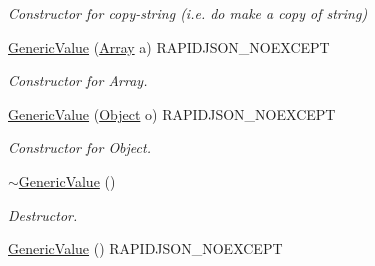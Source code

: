 \begin{DoxyCompactItemize}
\begin{DoxyCompactList}\small\item\em Constructor for copy-\/string (i.\+e. do make a copy of string) \end{DoxyCompactList}\item 
\hyperlink{class_generic_value_a953052ef91e54aabe9bdb9f9eaebf6cc}{Generic\+Value} (\hyperlink{class_generic_array}{Array} a) R\+A\+P\+I\+D\+J\+S\+O\+N\+\_\+\+N\+O\+E\+X\+C\+E\+PT
\begin{DoxyCompactList}\small\item\em Constructor for Array. \end{DoxyCompactList}\item 
\hyperlink{class_generic_value_a9c294e56f4ab940f845f7c171b183483}{Generic\+Value} (\hyperlink{class_generic_object}{Object} o) R\+A\+P\+I\+D\+J\+S\+O\+N\+\_\+\+N\+O\+E\+X\+C\+E\+PT
\begin{DoxyCompactList}\small\item\em Constructor for Object. \end{DoxyCompactList}\item 
\hyperlink{class_generic_value_a213ba89ef5ef961a5e655bd8c78ac9f4}{$\sim$\+Generic\+Value} ()
\begin{DoxyCompactList}\small\item\em Destructor. \end{DoxyCompactList}\item 
\hyperlink{class_generic_value_ab0205d57176d83814ea4e4598c596fe8}{Generic\+Value} () R\+A\+P\+I\+D\+J\+S\+O\+N\+\_\+\+N\+O\+E\+X\+C\+E\+PT\hypertarget{class_generic_value_ab0205d57176d83814ea4e4598c596fe8}{}\label{class_generic_value_ab0205d57176d83814ea4e4598c596fe8}


\end{DoxyCompactItemize}
